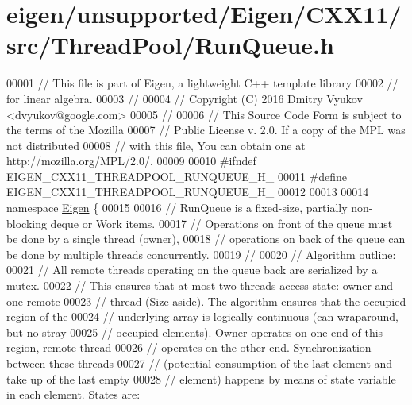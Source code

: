 \hypertarget{eigen_2unsupported_2_eigen_2_c_x_x11_2src_2_thread_pool_2_run_queue_8h_source}{}\section{eigen/unsupported/\+Eigen/\+C\+X\+X11/src/\+Thread\+Pool/\+Run\+Queue.h}
\label{eigen_2unsupported_2_eigen_2_c_x_x11_2src_2_thread_pool_2_run_queue_8h_source}

\begin{DoxyCode}
00001 \textcolor{comment}{// This file is part of Eigen, a lightweight C++ template library}
00002 \textcolor{comment}{// for linear algebra.}
00003 \textcolor{comment}{//}
00004 \textcolor{comment}{// Copyright (C) 2016 Dmitry Vyukov <dvyukov@google.com>}
00005 \textcolor{comment}{//}
00006 \textcolor{comment}{// This Source Code Form is subject to the terms of the Mozilla}
00007 \textcolor{comment}{// Public License v. 2.0. If a copy of the MPL was not distributed}
00008 \textcolor{comment}{// with this file, You can obtain one at http://mozilla.org/MPL/2.0/.}
00009 
00010 \textcolor{preprocessor}{#ifndef EIGEN\_CXX11\_THREADPOOL\_RUNQUEUE\_H\_}
00011 \textcolor{preprocessor}{#define EIGEN\_CXX11\_THREADPOOL\_RUNQUEUE\_H\_}
00012 
00013 
00014 \textcolor{keyword}{namespace }\hyperlink{namespace_eigen}{Eigen} \{
00015 
00016 \textcolor{comment}{// RunQueue is a fixed-size, partially non-blocking deque or Work items.}
00017 \textcolor{comment}{// Operations on front of the queue must be done by a single thread (owner),}
00018 \textcolor{comment}{// operations on back of the queue can be done by multiple threads concurrently.}
00019 \textcolor{comment}{//}
00020 \textcolor{comment}{// Algorithm outline:}
00021 \textcolor{comment}{// All remote threads operating on the queue back are serialized by a mutex.}
00022 \textcolor{comment}{// This ensures that at most two threads access state: owner and one remote}
00023 \textcolor{comment}{// thread (Size aside). The algorithm ensures that the occupied region of the}
00024 \textcolor{comment}{// underlying array is logically continuous (can wraparound, but no stray}
00025 \textcolor{comment}{// occupied elements). Owner operates on one end of this region, remote thread}
00026 \textcolor{comment}{// operates on the other end. Synchronization between these threads}
00027 \textcolor{comment}{// (potential consumption of the last element and take up of the last empty}
00028 \textcolor{comment}{// element) happens by means of state variable in each element. States are:}

\end{DoxyCode}
